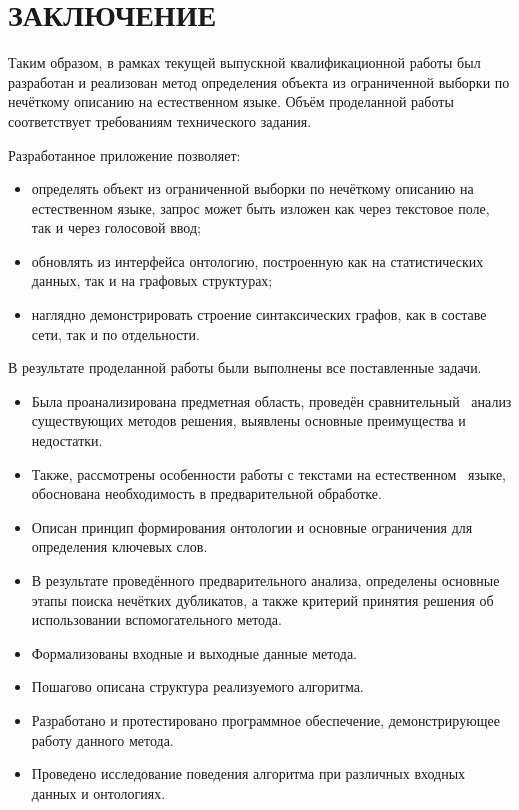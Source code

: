 \section*{ЗАКЛЮЧЕНИЕ}
Таким образом, в рамках текущей выпускной квалификационной работы был разработан и реализован метод определения объекта из ограниченной выборки по нечёткому описанию на естественном языке. Объём проделанной работы соответствует требованиям технического задания. 

Разработанное приложение позволяет: 
\begin{itemize}
	\item определять объект из ограниченной выборки по нечёткому описанию на естественном языке, запрос может быть изложен как через текстовое поле, так и через голосовой ввод;
	
	\item обновлять из интерфейса онтологию, построенную как на статистических данных, так и на графовых структурах;
	
	\item наглядно демонстрировать строение синтаксических графов, как в составе сети, так и по отдельности.
\end{itemize}
%
В результате проделанной работы были выполнены все поставленные задачи.
\begin{itemize}
	\item Была проанализирована предметная область, проведён сравнительный \, анализ существующих методов решения, выявлены основные преимущества и недостатки.
	
	\item Также, рассмотрены особенности работы с текстами на естественном \, языке, обоснована необходимость в предварительной обработке.
	
	\item Описан принцип формирования онтологии и основные ограничения для определения ключевых слов. 
	
	\item В результате проведённого предварительного анализа, определены основные этапы поиска нечётких дубликатов, а также критерий принятия решения об использовании вспомогательного метода.
	
	\item Формализованы входные и выходные данные метода. 
	
	\item Пошагово описана структура реализуемого алгоритма.
	
	\item Разработано и протестировано программное обеспечение, демонстрирующее работу данного метода.
	
	\item Проведено исследование поведения алгоритма при различных входных данных и онтологиях.
\end{itemize}
